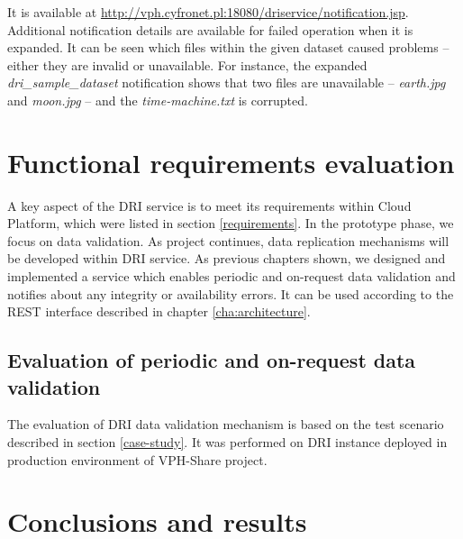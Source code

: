 It is available at \url{http://vph.cyfronet.pl:18080/driservice/notification.jsp}.\\

Additional notification details are available for failed operation when it is
expanded. It can be seen which files within the given dataset caused problems --
either they are invalid or unavailable. For instance, the expanded 
\textit{dri\_sample\_dataset} notification shows that two files are unavailable
-- \textit{earth.jpg} and \textit{moon.jpg} -- and the \textit{time-machine.txt}
is corrupted.

\section{Functional requirements evaluation}
A key aspect of the DRI service is to meet its requirements within Cloud
Platform, which were listed in section \ref{requirements}. In the prototype
phase, we focus on data validation. As project continues, data
replication mechanisms will be developed within DRI service. As previous
chapters shown, we designed and implemented a service which enables periodic
and on-request data validation and notifies about any integrity or availability
errors. It can be used according to the REST interface described in chapter
\ref{cha:architecture}.

\subsection{Evaluation of periodic and on-request data validation}
The evaluation of DRI data validation mechanism is based on the test scenario described
in section \ref{case-study}. It was performed on DRI instance deployed in production
environment of VPH-Share project.




\section{Conclusions and results}
